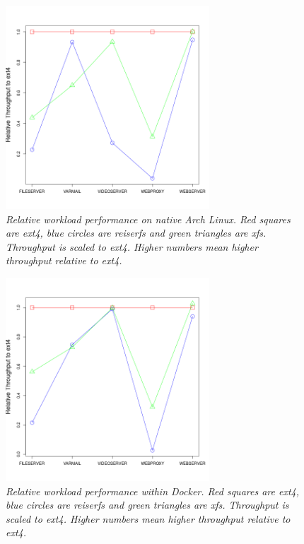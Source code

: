 \documentclass[letterpaper,twocolumn,10pt]{article}
\begin{document}
\begin{figure}[!ht]
\centering
\includegraphics[width=3in]{../results/arch_relative_performance.png}
\caption{\textit{Relative workload performance on native Arch Linux. Red squares are ext4, blue circles are reiserfs and green triangles are xfs. Throughput is scaled to ext4. Higher numbers mean higher throughput relative to ext4.}}
\label{fig:arch_relative_performance}
\end{figure}

\begin{figure}[!ht]
\centering
\includegraphics[width=3in]{../results/dock_relative_performance.png}
\caption{\textit{Relative workload performance within Docker. Red squares are ext4, blue circles are reiserfs and green triangles are xfs. Throughput is scaled to ext4. Higher numbers mean higher throughput relative to ext4.}}
\label{fig:dock_relative_performance}
\end{figure}
\end{document}
